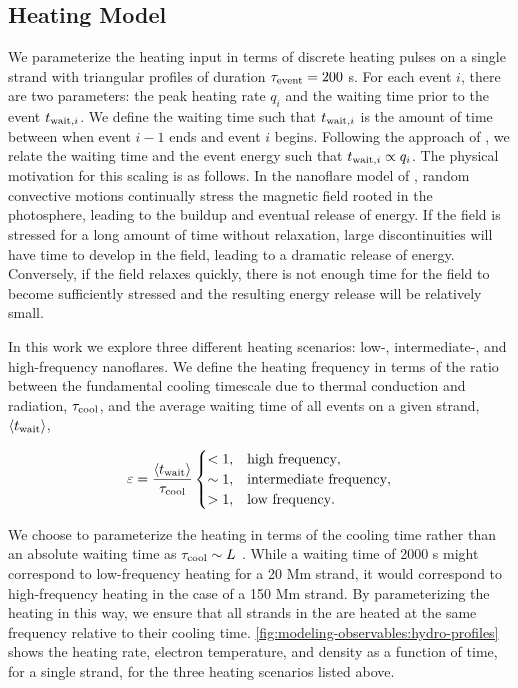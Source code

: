 \subsection{Heating Model}\label{sec:modeling-observables:heating}

We parameterize the heating input in terms of discrete heating pulses on a single strand with triangular profiles of duration $\tau_{\textup{event}}=200$ s. For each event $i$, there are two parameters: the peak heating rate $q_i$ and the waiting time prior to the event $\twait[,i]$. We define the waiting time such that $\twait[,i]$ is the amount of time between when event $i-1$ ends and event $i$ begins. Following the approach of \citet{cargill_active_2014}, we relate the waiting time and the event energy such that $\twait[,i]\propto q_i$. The physical motivation for this scaling is as follows. In the nanoflare model of \citet{parker_nanoflares_1988}, random convective motions continually stress the magnetic field rooted in the photosphere, leading to the buildup and eventual release of energy. If the field is stressed for a long amount of time without relaxation, large discontinuities will have time to develop in the field, leading to a dramatic release of energy. Conversely, if the field relaxes quickly, there is not enough time for the field to become sufficiently stressed and the resulting energy release will be relatively small. 

In this work we explore three different heating scenarios: low-, intermediate-, and high-frequency nanoflares. We define the heating frequency in terms of the ratio between the fundamental cooling timescale due to thermal conduction and radiation, $\tau_{\textup{cool}}$, and the average waiting time of all events on a given strand, $\langle \twait\rangle$,

\begin{equation}\label{eq:modeling-observables:heating_types}
    \varepsilon = \frac{\langle \twait\rangle}{\tau_{\textup{cool}}}
    \begin{cases} 
        < 1, &  \text{high frequency},\\
        \sim1, & \text{intermediate frequency}, \\
        > 1, & \text{low frequency}.
     \end{cases}
\end{equation}

We choose to parameterize the heating in terms of the cooling time rather than an absolute waiting time as $\tau_{\textup{cool}}\sim L$ \citep[see appendix of][]{cargill_active_2014}. While a waiting time of 2000 s might correspond to low-frequency heating for a 20 Mm strand, it would correspond to high-frequency heating in the case of a 150 Mm strand. By parameterizing the heating in this way, we ensure that all strands in the \AR{} are heated at the same frequency relative to their cooling time. \autoref{fig:modeling-observables:hydro-profiles} shows the heating rate, electron temperature, and density as a function of time, for a single strand, for the three heating scenarios listed above.

